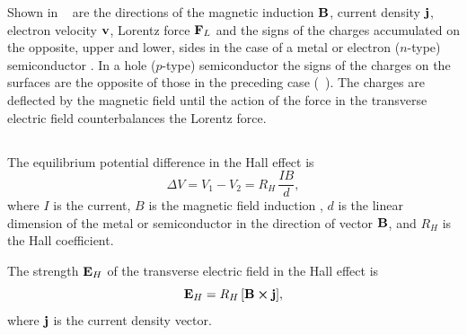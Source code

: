 Shown in ~ are the directions of the magnetic induction $\vb{B}$, current density $\vb{j}$, electron velocity $\vb{v}$, Lorentz force $\vb{F}_{L}$ and the signs of the charges accumulated on the opposite, upper and lower, sides in the case of a metal or electron ($n$-type) semiconductor . In a hole ($p$-type) semiconductor  the signs of the charges on the surfaces are the opposite of those in the preceding case (~). The charges are deflected by the magnetic field until the action of the force in the transverse electric field counterbalances the Lorentz force.

\subsection{}\label{24.2.2} The equilibrium potential difference in the Hall effect is
\begin{equation*}%
\Delta V = V_{1} - V_{2} = R_{H} \, \frac{IB}{d},
\end{equation*}
where $I$ is the current, $B$ is the magnetic field induction , $d$ is the linear dimension of the metal or semiconductor in the direction of vector $\vb{B}$, and $R_{H}$ is the Hall coefficient.

The strength $\vb{E}_{H}$ of the transverse electric field in the Hall effect is
\begin{equation*}%
\vb{E}_{H} = R_{H} \, [\vb{B} \cross \vb{j}],
\end{equation*}
where $\vb{j}$ is the current density vector.


